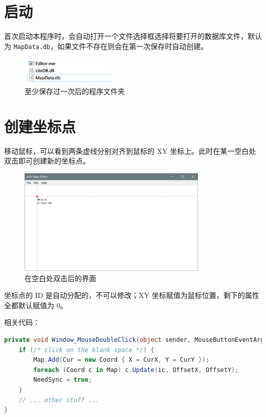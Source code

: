 \section{启动}

首次启动本程序时，会自动打开一个文件选择框选择将要打开的数据库文件，默认为 \texttt{MapData.db}，如果文件不存在则会在第一次保存时自动创建。

\begin{figure}[H]
  \centering
  \includegraphics[width=0.4\textwidth]{assets/explorer.png}
  \caption{至少保存过一次后的程序文件夹}
  \label{fig:explorer}
\end{figure}

\section{创建坐标点}

移动鼠标，可以看到两条虚线分别对齐到鼠标的 XY 坐标上。此时在某一空白处双击即可创建新的坐标点。

\begin{figure}[H]
  \centering
  \includegraphics[width=0.8\textwidth]{assets/dbclick.png}
  \caption{在空白处双击后的界面}
  \label{fig:dbclick}
\end{figure}

坐标点的 ID 是自动分配的，不可以修改；XY 坐标赋值为鼠标位置，剩下的属性全都默认赋值为 0。

相关代码：

\begin{lstlisting}[language=cs]
private void Window_MouseDoubleClick(object sender, MouseButtonEventArgs e) {
    if (/* click on the blank space */) {
        Map.Add(Cur = new Coord { X = CurX, Y = CurY });
        foreach (Coord c in Map) c.Update(ic, OffsetX, OffsetY);
        NeedSync = true;
    }
    // ... other stuff ...
}
\end{lstlisting}

